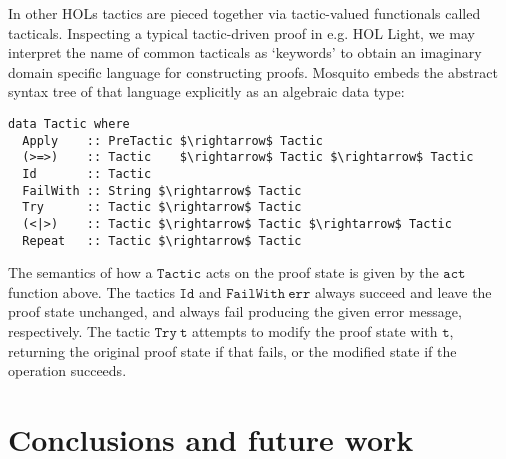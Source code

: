 \documentclass{llncs}
\newcommand{\mosquito}{Mosquito\xspace}
\begin{document}
In other HOLs tactics are pieced together via tactic-valued functionals called tacticals.
Inspecting a typical tactic-driven proof in e.g. HOL Light, we may interpret the name of common tacticals as `keywords' to obtain an imaginary domain specific language for constructing proofs.
\mosquito embeds the abstract syntax tree of that language explicitly as an algebraic data type:
\begin{lstlisting}
data Tactic where
  Apply    :: PreTactic $\rightarrow$ Tactic
  (>=>)    :: Tactic    $\rightarrow$ Tactic $\rightarrow$ Tactic
  Id       :: Tactic
  FailWith :: String $\rightarrow$ Tactic
  Try      :: Tactic $\rightarrow$ Tactic
  (<|>)    :: Tactic $\rightarrow$ Tactic $\rightarrow$ Tactic
  Repeat   :: Tactic $\rightarrow$ Tactic
\end{lstlisting}

The semantics of how a $\mathtt{Tactic}$ acts on the proof state is given by the $\mathtt{act}$ function above.
The tactics $\mathtt{Id}$ and $\mathtt{FailWith\ err}$ always succeed and leave the proof state unchanged, and always fail producing the given error message, respectively.
The tactic $\mathtt{Try\ t}$ attempts to modify the proof state with $\mathtt{t}$, returning the original proof state if that fails, or the modified state if the operation succeeds.

\section{Conclusions and future work}
\label{sect.conclusions}


\end{document}
